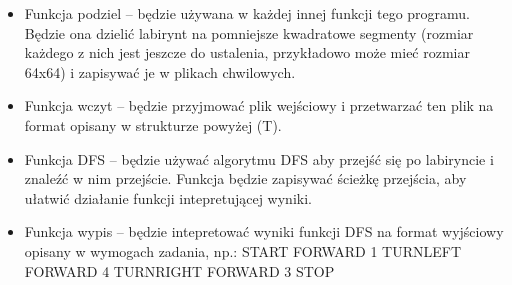 \documentclass{article}
\begin{document}
\begin{itemize}

\item Funkcja podziel – będzie używana w każdej innej funkcji tego programu. Będzie ona dzielić labirynt na pomniejsze kwadratowe segmenty (rozmiar każdego z nich jest jeszcze do ustalenia, przykładowo może mieć rozmiar 64x64) i zapisywać je w plikach chwilowych.

\item Funkcja wczyt – będzie przyjmować plik wejściowy i przetwarzać ten plik na format opisany  w strukturze powyżej (T).

\item Funkcja DFS – będzie używać algorytmu DFS aby przejść się po labiryncie i znaleźć w nim przejście. Funkcja będzie zapisywać ścieżkę przejścia, aby ułatwić działanie funkcji intepretującej wyniki. 

\item Funkcja wypis – będzie intepretować wyniki funkcji DFS na format wyjściowy opisany w wymogach zadania, np.:\newline
START\newline
FORWARD 1\newline
TURNLEFT\newline
FORWARD 4\newline
TURNRIGHT\newline
FORWARD 3\newline
STOP\newline
\end{itemize}
\end{document}
